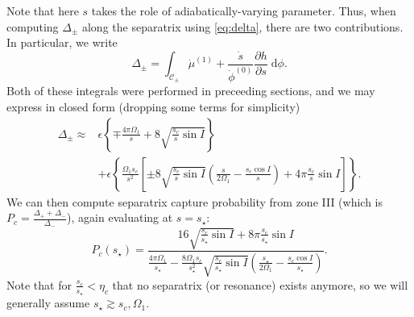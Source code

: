\documentclass[
        fleqn,
        usenatbib,
    ]{mnras}
\newcommand*{\pd}[2]{\frac{\partial#1}{\partial#2}}
\newcommand*{\p}[1]{\left(#1\right)}
\newcommand*{\s}[1]{\left[#1\right]}
\newcommand*{\z}[1]{\left\{#1\right\}}
\begin{document}
Note that here $s$ takes the role of adiabatically-varying parameter. Thus, when
computing $\Delta_{\pm}$ along the separatrix using \autoref{eq:delta}, there
are two contributions. In particular, we write
\begin{equation}
    \Delta_{\pm} = \int_{\mathcal{C}_{\pm}} \dot{\mu}^{(1)} +
        \frac{\dot{s}}{\dot{\phi}^{(0)}} \pd{h}{s}
        \;\mathrm{d}\phi.
\end{equation}
Both of these integrals were performed in preceeding sections, and we may
express in closed form (dropping some terms for simplicity)
\begin{align}
    \Delta_{\pm} \approx{}& \epsilon\z{
            \mp \frac{4\pi  \Omega_1}{s} + 8\sqrt{\frac{s_c}{s}\sin I}
            }\nonumber\\
        &+\epsilon\z{\frac{ \Omega_1 s_c}{s^2}
            \s{\pm 8\sqrt{\frac{s_c}{s} \sin I}
            \p{\frac{s}{2\Omega_1} - \frac{s_c\cos I}{s}}
                + 4\pi \frac{s_c}{s}\sin I}}.\label{eq:delta_p4}
\end{align}
We can then compute separatrix capture probability from zone III (which is $P_c
= \frac{\Delta_+ + \Delta_-}{\Delta_-}$), again evaluating at $s = s_\star$:
\begin{equation}
    P_c(s_\star) = \frac{16\sqrt{\frac{s_c}{s_\star}\sin I} +
        8\pi\frac{s_c}{s_\star}\sin I}{
            \frac{4\pi \Omega_1}{s_\star} - \frac{8\Omega_1
            s_c}{s_\star^2}\sqrt{\frac{s_c}{s_\star}\sin I}
            \p{\frac{s_\star}{2\Omega_1} - \frac{s_c \cos I}{s_\star}}}.
            \label{eq:p_c_p4}
\end{equation}
Note that for $\frac{s_c}{s_\star} < \eta_c$ that no separatrix (or resonance)
exists anymore, so we will generally assume $s_\star \gtrsim s_c, \Omega_1$.
\end{document}
